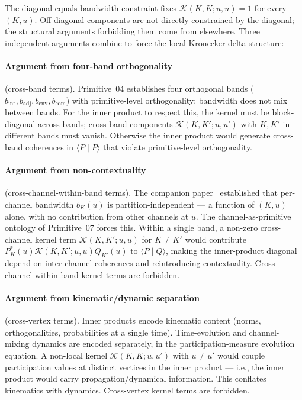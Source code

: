 \documentclass[11pt,a4paper]{article}
\begin{document}
The diagonal-equals-bandwidth constraint fixes $\mathcal{K}(K, K; u, u) = 1$ for every $(K, u)$. Off-diagonal components are not directly constrained by the diagonal; the structural arguments forbidding them come from elsewhere. Three independent arguments combine to force the local Kronecker-delta structure:

\paragraph{Argument from four-band orthogonality} (cross-band terms). Primitive~04 establishes four orthogonal bands ($b_\mathrm{int}, b_\mathrm{adj}, b_\mathrm{env}, b_\mathrm{com}$) with primitive-level orthogonality: bandwidth does not mix between bands. For the inner product to respect this, the kernel must be block-diagonal across bands; cross-band components $\mathcal{K}(K, K'; u, u')$ with $K, K'$ in different bands must vanish. Otherwise the inner product would generate cross-band coherences in $\langle P \mid P \rangle$ that violate primitive-level orthogonality.

\paragraph{Argument from non-contextuality} (cross-channel-within-band terms). The companion paper~\cite{borngleason} established that per-channel bandwidth $b_K(u)$ is partition-independent --- a function of $(K, u)$ alone, with no contribution from other channels at $u$. The channel-as-primitive ontology of Primitive~07 forces this. Within a single band, a non-zero cross-channel kernel term $\mathcal{K}(K, K'; u, u)$ for $K \neq K'$ would contribute $P_K^*(u) \mathcal{K}(K, K'; u, u) Q_{K'}(u)$ to $\langle P \mid Q \rangle$, making the inner-product diagonal depend on inter-channel coherences and reintroducing contextuality. Cross-channel-within-band kernel terms are forbidden.

\paragraph{Argument from kinematic/dynamic separation} (cross-vertex terms). Inner products encode kinematic content (norms, orthogonalities, probabilities at a single time). Time-evolution and channel-mixing dynamics are encoded separately, in the participation-measure evolution equation. A non-local kernel $\mathcal{K}(K, K; u, u')$ with $u \neq u'$ would couple participation values at distinct vertices in the inner product --- i.e., the inner product would carry propagation/dynamical information. This conflates kinematics with dynamics. Cross-vertex kernel terms are forbidden.
\end{document}
